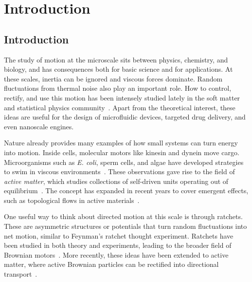 \part{Introduction}
\label{part:introduction}

\chapter{Introduction}
\label{ch:introduction}

The study of motion at the microscale sits between physics, chemistry, and biology, and has consequences both for basic science and for applications. At these scales, inertia can be ignored and viscous forces dominate. Random fluctuations from thermal noise also play an important role. How to control, rectify, and use this motion has been intensely studied lately in the soft matter and statistical physics community~\cite{purcell2014life,einstein1906theory}. Apart from the theoretical interest, these ideas are useful for the design of microfluidic devices, targeted drug delivery, and even nanoscale engines.

Nature already provides many examples of how small systems can turn energy into motion. Inside cells, molecular motors like kinesin and dynein move cargo. Microorganisms such as \textit{E. coli}, sperm cells, and algae have developed strategies to swim in viscous environments~\cite{howard2002mechanics, vale2003molecular, marchetti2013hydrodynamics}. These observations gave rise to the field of \textit{active matter}, which studies collections of self-driven units operating out of equilibrium~\cite{ramaswamy2010mechanics, needleman2017active, bechinger2016active}. The concept has expanded in recent years to cover emergent effects, such as topological flows in active materials~\cite{shankar2022topological}.

One useful way to think about directed motion at this scale is through ratchets. These are asymmetric structures or potentials that turn random fluctuations into net motion, similar to Feynman’s ratchet thought experiment. Ratchets have been studied in both theory and experiments, leading to the broader field of Brownian motors~\cite{julicher1997modeling, reimann2002brownian}. More recently, these ideas have been extended to active matter, where active Brownian particles can be rectified into directional transport~\cite{fiasconaro2008active, reichhardt2017ratchet, rein2023force}.

